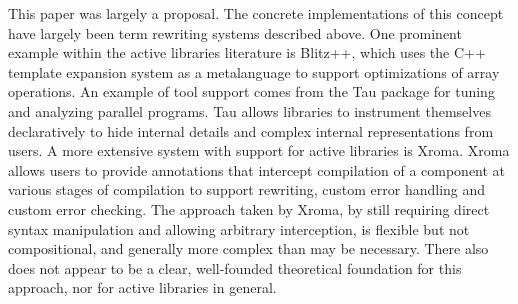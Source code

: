 This paper was largely a proposal. The concrete implementations of this concept have largely been term rewriting systems described above. One prominent example within the active libraries literature is Blitz++, which uses the C++ template expansion system as a metalanguage to support optimizations of array operations. An example of tool support comes from the Tau package for tuning and analyzing parallel programs. Tau allows libraries to instrument themselves declaratively to hide internal details and complex internal representations from users. A more extensive system with support for active libraries is Xroma. Xroma allows users to provide annotations that intercept compilation of a component at various stages of compilation to support rewriting, custom error handling and custom error checking. The approach taken by Xroma, by still requiring direct syntax manipulation and allowing arbitrary interception, is flexible but not compositional, and generally more complex than may be necessary. There also does not appear to be a clear, well-founded theoretical foundation for this approach, nor for active libraries in general.



